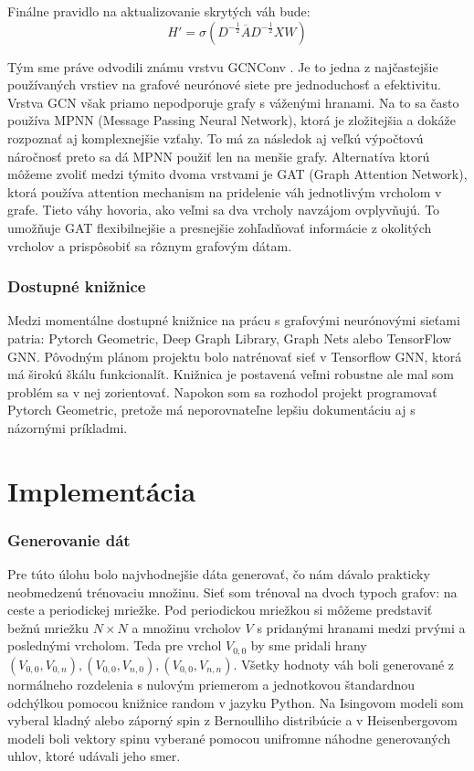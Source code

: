 \documentclass{article}
\begin{document}
Finálne pravidlo na aktualizovanie skrytých váh bude:
$$H' = \sigma(D^{-\frac{1}{2}} \overline{A} D^{-\frac{1}{2}} XW) $$

Tým sme práve odvodili známu vrstvu GCNConv \cite{GCN}. Je to jedna z najčastejšie používaných vrstiev na grafové neurónové siete pre jednoduchosť a efektivitu. Vrstva GCN však priamo nepodporuje grafy s váženými hranami. Na to sa často používa MPNN (Message Passing Neural Network), ktorá je zložitejšia a dokáže rozpoznať aj komplexnejšie vzťahy. To má za následok aj veľkú výpočtovú náročnosť preto sa dá MPNN použiť len na menšie grafy. Alternatíva ktorú môžeme zvoliť medzi týmito dvoma vrstvami je GAT (Graph Attention Network), ktorá používa attention mechanism na pridelenie váh jednotlivým vrcholom v grafe. Tieto váhy hovoria, ako veľmi sa dva vrcholy navzájom ovplyvňujú. To umožňuje GAT flexibilnejšie a presnejšie zohľadňovať informácie z okolitých vrcholov a prispôsobiť sa rôznym grafovým dátam. \cite{GAT}


\subsubsection*{Dostupné knižnice}
Medzi momentálne dostupné knižnice na prácu s grafovými neurónovými sieťami patria: Pytorch Geometric, Deep Graph Library, Graph Nets alebo TensorFlow GNN. Pôvodným plánom projektu bolo natrénovať sieť v Tensorflow GNN, ktorá má širokú škálu funkcionalít. Knižnica je postavená veľmi robustne ale mal som problém sa v nej zorientovať. Napokon som sa rozhodol projekt programovať Pytorch Geometric, pretože má neporovnateľne lepšiu dokumentáciu aj s názornými príkladmi.


\section*{Implementácia}
\subsubsection*{Generovanie dát}
Pre túto úlohu bolo najvhodnejšie dáta generovať, čo nám dávalo prakticky neobmedzenú trénovaciu množinu. Sieť som trénoval na dvoch typoch grafov: na ceste a periodickej mriežke. Pod periodickou mriežkou si môžeme predstaviť bežnú mriežku $N \times N$ a množinu vrcholov $V$ s pridanými hranami medzi prvými a poslednými vrcholom. Teda pre vrchol $V_{0,0}$ by sme pridali hrany $(V_{0, 0}, V_{0, n}), (V_{0, 0}, V_{n, 0}), (V_{0, 0}, V_{n, n})$. Všetky hodnoty váh boli generované z normálneho rozdelenia s nulovým priemerom a jednotkovou štandardnou odchýlkou pomocou knižnice random v jazyku Python. Na Isingovom modeli som vyberal kladný alebo záporný spin z Bernoulliho distribúcie a v Heisenbergovom modeli boli vektory spinu vyberané pomocou unifromne náhodne generovaných uhlov, ktoré udávali jeho smer.
\end{document}
